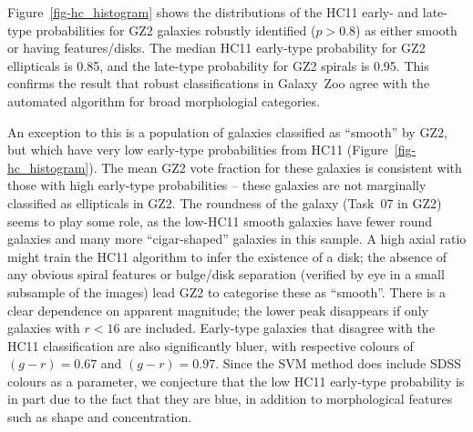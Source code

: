 \documentclass[useAMS,usenatbib]{mn2e}
\begin{document}

Figure~\ref{fig-hc_histogram} shows the distributions of the HC11 early- and late-type probabilities for GZ2 galaxies robustly identified ($p>0.8$) as either smooth or having features/disks. The median HC11 early-type probability for GZ2 ellipticals is 0.85, and the late-type probability for GZ2 spirals is 0.95. This confirms the result that robust classifications in Galaxy~Zoo agree with the automated algorithm for broad morphologial categories. 

An exception to this is a population of galaxies classified as ``smooth'' by GZ2, but which have very low early-type probabilities from HC11 (Figure~\ref{fig-hc_histogram}). The mean GZ2 vote fraction for these galaxies is consistent with those with high early-type probabilities -- these galaxies are not marginally classified as ellipticals in GZ2. The roundness of the galaxy (Task~07 in GZ2) seems to play some role, as the low-HC11 smooth galaxies have fewer round galaxies and many more ``cigar-shaped'' galaxies in this sample. A high axial ratio might train the HC11 algorithm to infer the existence of a disk; the absence of any obvious spiral features or bulge/disk separation (verified by eye in a small subsample of the images) lead GZ2 to categorise these as ``smooth''. There is a clear dependence on apparent magnitude; the lower peak disappears if only galaxies with $r<16$ are included. Early-type galaxies that disagree with the HC11 classification are also significantly bluer, with respective colours of $(g-r)=0.67$ and $(g-r)=0.97$. Since the SVM method does include SDSS colours as a parameter, we conjecture that the low HC11 early-type probability is in part due to the fact that they are blue, in addition to morphological features such as shape and concentration. %
\end{document}
